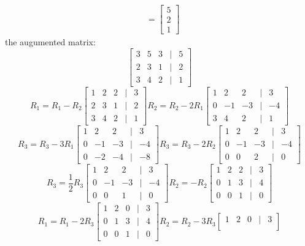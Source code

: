 \documentclass[11pt]{article}
\begin{document}
\begin{enumerate}
\begin{enumerate}
\[\begin{aligned}
    &= \begin{bmatrix}
        5 \\
        2 \\
        1
    \end{bmatrix}
\end{aligned}
\]
the augumented matrix:
\[
\begin{bmatrix}
    3 & 5 & 3 &|& 5 \\
    2 & 3 & 1 &|& 2 \\
    3 & 4 & 2 &|& 1
\end{bmatrix}
\]
\[
R_1 = R_1 - R_2
\begin{bmatrix}
    1 & 2 & 2 &|& 3 \\
    2 & 3 & 1 &|& 2 \\
    3 & 4 & 2 &|& 1
\end{bmatrix}
R_2 = R_2 - 2R_1
\begin{bmatrix}
    1 & 2 & 2 &|& 3 \\
    0 & -1 & -3 &|& -4 \\
    3 & 4 & 2 &|& 1
\end{bmatrix}
\]
\[
R_3 = R_3 - 3R_1
\begin{bmatrix}
    1 & 2 & 2 &|& 3 \\
    0 & -1 & -3 &|& -4 \\
    0 & -2 & -4 &|& -8
\end{bmatrix}
R_3 = R_3 - 2R_2
\begin{bmatrix}
    1 & 2 & 2 &|& 3 \\
    0 & -1 & -3 &|& -4 \\
    0 & 0 & 2 &|& 0
\end{bmatrix}
\]
\[
R_3 = \frac{1}{2}R_3
\begin{bmatrix}
    1 & 2 & 2 &|& 3 \\
    0 & -1 & -3 &|& -4 \\
    0 & 0 & 1 &|& 0
\end{bmatrix}
R_2 = -R_2
\begin{bmatrix}
    1 & 2 & 2 &|& 3 \\
    0 & 1 & 3 &|& 4 \\
    0 & 0 & 1 &|& 0
\end{bmatrix}
\]
\[
R_1 = R_1 - 2R_3
\begin{bmatrix}
    1 & 2 & 0 &|& 3 \\
    0 & 1 & 3 &|& 4 \\
    0 & 0 & 1 &|& 0
\end{bmatrix}
R_2 = R_2 - 3R_3
\begin{bmatrix}
    1 & 2 & 0 &|& 3 \\

\end{bmatrix}\]
\end{enumerate}
\end{enumerate}
\end{document}
